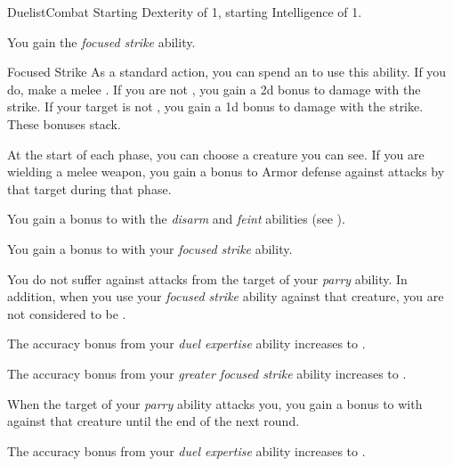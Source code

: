     \begin{feat}{Duelist}{Combat}
        \featpre Starting Dexterity of 1, starting Intelligence of 1.

         You gain the \textit{focused strike} ability.
        \begin{ability}{Focused Strike}
            As a standard action, you can spend an  to use this ability.
            If you do, make a melee .
            If you are not , you gain a \plus2d bonus to damage with the strike.
            If your target is not , you gain a \plus1d bonus to damage with the strike.
            These bonuses stack.
        \end{ability}

         At the start of each phase, you can choose a creature you can see.
        If you are wielding a melee weapon, you gain a  bonus to Armor defense against attacks by that target during that phase.

         You gain a  bonus to  with the \textit{disarm} and \textit{feint} abilities (see ).

         You gain a  bonus to  with your \textit{focused strike} ability.

         You do not suffer  against attacks from the target of your \textit{parry} ability.
        In addition, when you use your \textit{focused strike} ability against that creature, you are not considered to be .

         The accuracy bonus from your \textit{duel expertise} ability increases to . 

         The accuracy bonus from your \textit{greater focused strike} ability increases to .

         When the target of your \textit{parry} ability attacks you, you gain a  bonus to  with  against that creature until the end of the next round.

         The accuracy bonus from your \textit{duel expertise} ability increases to . 

        \ff[18]{}
    \end{feat}

